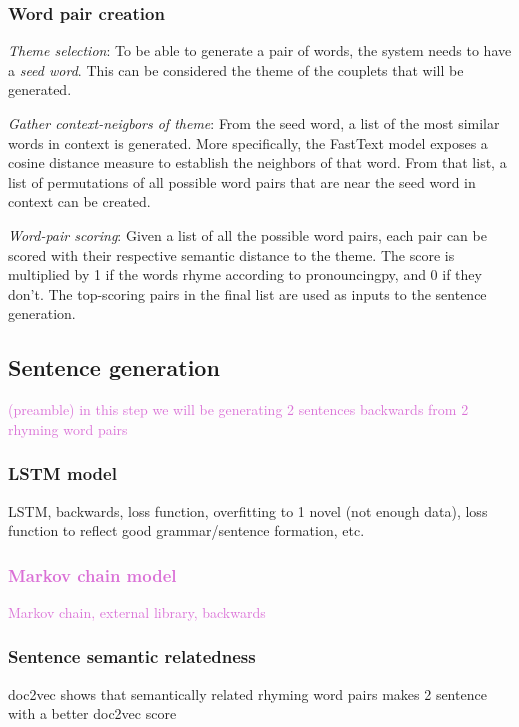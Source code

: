 \documentclass[11pt,a4paper]{article}
\newenvironment{tight_enumerate}{
\begin{enumerate}
\setlength{\itemsep}{0pt}
\setlength{\parskip}{0pt}
}{\end{enumerate}}
\begin{document}
\subsubsection{Word pair creation}
\begin{tight_enumerate}
	\item \textit{Theme selection}: To be able to generate a pair of words, the system needs to have a \textit{seed word}. This can be considered the theme of the couplets that will be generated.
	\item \textit{Gather context-neigbors of theme}: From the seed word, a list of the most similar words in context is generated. More specifically, the FastText model exposes a cosine distance measure to establish the neighbors of that word. From that list, a list of permutations of all possible word pairs that are near the seed word in context can be created.
	\item \textit{Word-pair scoring}: Given a list of all the possible word pairs, each pair can be scored with their respective semantic distance to the theme. The score is multiplied by 1 if the words rhyme according to pronouncingpy, and 0 if they don't. The top-scoring pairs in the final list are used as inputs to the sentence generation.
\end{tight_enumerate}

\subsection{Sentence generation}
\label{sec:languagegen}

\textcolor{Orchid}{
	(preamble) in this step we will be generating 2 sentences backwards from 2 rhyming word pairs
}

\textcolor{Dandelion}{
\subsubsection{LSTM model}
\label{sec:lstm}
LSTM, backwards, loss function, overfitting to 1 novel (not enough data), loss function to reflect good grammar/sentence formation, etc.
}

\textcolor{Orchid}{
\subsubsection{Markov chain model}
\label{sec:markov}
Markov chain, external library, backwards
}

\textcolor{Dandelion}{
\subsubsection{Sentence semantic relatedness}
\label{sec:doc2vec}
doc2vec shows that semantically related rhyming word pairs makes 2 sentence with a better doc2vec score
}
\end{document}
